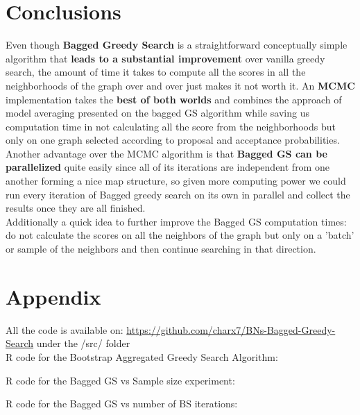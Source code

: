 \documentclass{article}
\begin{document}
	\section{Conclusions}
	Even though \textbf{Bagged Greedy Search} is a straightforward conceptually simple
	algorithm that \textbf{leads to a substantial improvement} over vanilla greedy search,
	the amount of time it takes to compute all the scores in all the neighborhoods 
	of the graph over and over just makes it not worth it. An \textbf{MCMC} implementation 
	takes the \textbf{best of both worlds} and combines the approach of model averaging 
	presented on the bagged GS algorithm while saving us
	computation time in not calculating all the score from the neighborhoods but 
	only on one graph selected according to proposal and acceptance probabilities. 
	\\
	Another advantage over the MCMC algorithm is that \textbf{Bagged GS can be
	parallelized} quite easily since all of its iterations are independent from
	one another forming a nice map structure, so given more computing power we
	could run every iteration of Bagged greedy search on its own in parallel and
	collect the results once they are all finished.
	\\
	Additionally a quick idea to further improve the Bagged GS computation times: do not
	calculate the scores on all the neighbors of the graph but only on a
	'batch' or sample of the neighbors and then continue searching in that
	direction. \\

	\section*{Appendix}
	All the code is available 
	on: \url{
	https://github.com/charx7/BNs-Bagged-Greedy-Search} under the /src/ folder
	\\
	R code for the Bootstrap Aggregated Greedy Search Algorithm:
	
	R code for the Bagged GS vs Sample size experiment:
	
	R code for the Bagged GS vs number of BS iterations:
	

	
	
\end{document}
